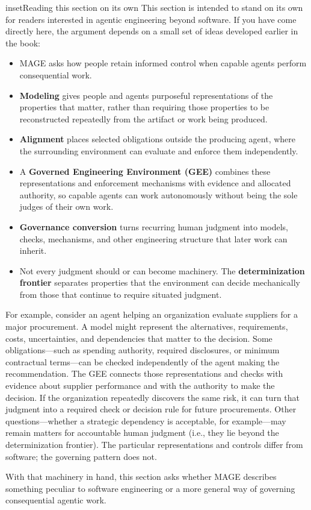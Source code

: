 


\begin{bookbox}{inset}{Reading this section on its own}
\label{inset-read-beyond-software-standalone}
This section is intended to stand on its own for readers interested in agentic engineering beyond software. If you have come directly here, the argument depends on a small set of ideas developed earlier in the book:

\begin{itemize}
\tightlist
\item
  MAGE asks how people retain informed control when capable agents perform consequential work.
\item
  \textbf{Modeling} gives people and agents purposeful representations of the properties that matter, rather than requiring those properties to be reconstructed repeatedly from the artifact or work being produced.
\item
  \textbf{Alignment} places selected obligations outside the producing agent, where the surrounding environment can evaluate and enforce them independently.
\item
  A \textbf{Governed Engineering Environment (GEE)} combines these representations and enforcement mechanisms with evidence and allocated authority, so capable agents can work autonomously without being the sole judges of their own work.
\item
  \textbf{Governance conversion} turns recurring human judgment into models, checks, mechanisms, and other engineering structure that later work can inherit.
\item
  Not every judgment should or can become machinery. The \textbf{determinization frontier} separates properties that the environment can decide mechanically from those that continue to require situated judgment.
\end{itemize}

For example, consider an agent helping an organization evaluate suppliers for a major procurement. A model might represent the alternatives, requirements, costs, uncertainties, and dependencies that matter to the decision. Some obligations---such as spending authority, required disclosures, or minimum contractual terms---can be checked independently of the agent making the recommendation. The GEE connects those representations and checks with evidence about supplier performance and with the authority to make the decision. If the organization repeatedly discovers the same risk, it can turn that judgment into a required check or decision rule for future procurements. Other questions---whether a strategic dependency is acceptable, for example---may remain matters for accountable human judgment (i.e., they lie beyond the determinization frontier). The particular representations and controls differ from software; the governing pattern does not.

With that machinery in hand, this section asks whether MAGE describes something peculiar to software engineering or a more general way of governing consequential agentic work.
\end{bookbox}
